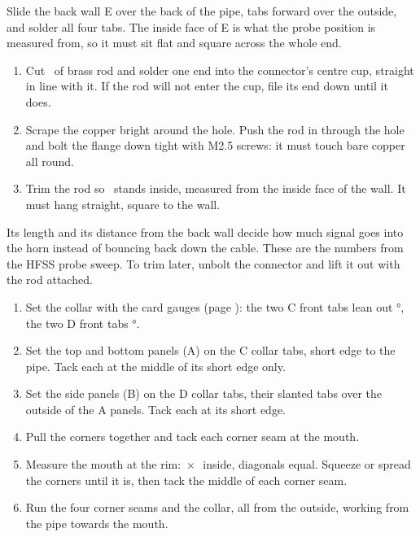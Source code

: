 \documentclass[10pt]{article}
\begin{document}
Slide the back wall E over the back of the pipe, tabs forward over the outside, and solder all four tabs. The inside face of E is what the probe position is measured from, so it must sit flat and square across the whole end.

\begin{enumerate}
  \item Cut \rodCut\ of brass rod and solder one end into the connector's centre cup, straight in line with it. If the rod will not enter the cup, file its end down until it does.
  \item Scrape the copper bright around the hole. Push the rod in through the hole and bolt the flange down tight with M2.5 screws: it must touch bare copper all round.
  \item Trim the rod so \probeLen\ stands inside, measured from the inside face of the wall. It must hang straight, square to the wall.
\end{enumerate}
\begin{note}
Its length and its distance from the back wall decide how much signal goes into the horn instead of bouncing back down the cable. These are the numbers from the HFSS probe sweep. To trim later, unbolt the connector and lift it out with the rod attached.
\end{note}

\begin{enumerate}
  \item Set the collar with the card gauges (page \pageref{sec:gauges}): the two C front tabs lean out \leanTop°, the two D front tabs \leanSide°.
  \item Set the top and bottom panels (A) on the C collar tabs, short edge to the pipe. Tack each at the middle of its short edge only.
  \item Set the side panels (B) on the D collar tabs, their slanted tabs over the outside of the A panels. Tack each at its short edge.
  \item Pull the corners together and tack each corner seam at the mouth.
  \item Measure the mouth at the rim: \aperW\,×\,\aperH\ inside, diagonals equal. Squeeze or spread the corners until it is, then tack the middle of each corner seam.
  \item Run the four corner seams and the collar, all from the outside, working from the pipe towards the mouth.
\end{enumerate}
\end{document}
